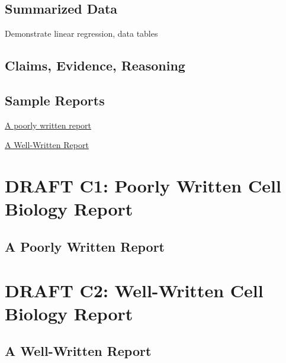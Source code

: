 \documentclass[
]{book}
\begin{document}
\hypertarget{summarized-data-2}{%
\section{Summarized Data}\label{summarized-data-2}}

Demonstrate linear regression, data tables

\hypertarget{claims-evidence-reasoning-2}{%
\section{Claims, Evidence, Reasoning}\label{claims-evidence-reasoning-2}}

\hypertarget{sample-reports-2}{%
\section{Sample Reports}\label{sample-reports-2}}

\protect\hyperlink{appc833}{A poorly written report}

\protect\hyperlink{appc835}{A Well-Written Report}

\hypertarget{draft-c1-poorly-written-cell-biology-report}{%
\chapter*{DRAFT C1: Poorly Written Cell Biology Report}\label{draft-c1-poorly-written-cell-biology-report}}

\hypertarget{appc833}{%
\section{A Poorly Written Report}\label{appc833}}

\hypertarget{draft-c2-well-written-cell-biology-report}{%
\chapter*{DRAFT C2: Well-Written Cell Biology Report}\label{draft-c2-well-written-cell-biology-report}}

\hypertarget{appc835}{%
\section{A Well-Written Report}\label{appc835}}

  
\end{document}
